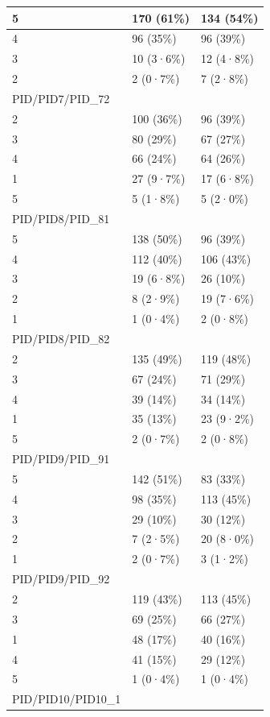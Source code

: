 \documentclass[
]{book}
\begin{document}
\begin{tabular}{l|l|l}
\hline
5 & 170 (61\%) & 134 (54\%)\\
\hline
4 & 96 (35\%) & 96 (39\%)\\
\hline
3 & 10 (3·6\%) & 12 (4·8\%)\\
\hline
2 & 2 (0·7\%) & 7 (2·8\%)\\
\hline
PID/PID7/PID\_72 &  & \\
\hline
2 & 100 (36\%) & 96 (39\%)\\
\hline
3 & 80 (29\%) & 67 (27\%)\\
\hline
4 & 66 (24\%) & 64 (26\%)\\
\hline
1 & 27 (9·7\%) & 17 (6·8\%)\\
\hline
5 & 5 (1·8\%) & 5 (2·0\%)\\
\hline
PID/PID8/PID\_81 &  & \\
\hline
5 & 138 (50\%) & 96 (39\%)\\
\hline
4 & 112 (40\%) & 106 (43\%)\\
\hline
3 & 19 (6·8\%) & 26 (10\%)\\
\hline
2 & 8 (2·9\%) & 19 (7·6\%)\\
\hline
1 & 1 (0·4\%) & 2 (0·8\%)\\
\hline
PID/PID8/PID\_82 &  & \\
\hline
2 & 135 (49\%) & 119 (48\%)\\
\hline
3 & 67 (24\%) & 71 (29\%)\\
\hline
4 & 39 (14\%) & 34 (14\%)\\
\hline
1 & 35 (13\%) & 23 (9·2\%)\\
\hline
5 & 2 (0·7\%) & 2 (0·8\%)\\
\hline
PID/PID9/PID\_91 &  & \\
\hline
5 & 142 (51\%) & 83 (33\%)\\
\hline
4 & 98 (35\%) & 113 (45\%)\\
\hline
3 & 29 (10\%) & 30 (12\%)\\
\hline
2 & 7 (2·5\%) & 20 (8·0\%)\\
\hline
1 & 2 (0·7\%) & 3 (1·2\%)\\
\hline
PID/PID9/PID\_92 &  & \\
\hline
2 & 119 (43\%) & 113 (45\%)\\
\hline
3 & 69 (25\%) & 66 (27\%)\\
\hline
1 & 48 (17\%) & 40 (16\%)\\
\hline
4 & 41 (15\%) & 29 (12\%)\\
\hline
5 & 1 (0·4\%) & 1 (0·4\%)\\
\hline
PID/PID10/PID10\_1 &  & \\

\end{tabular}
\end{document}
